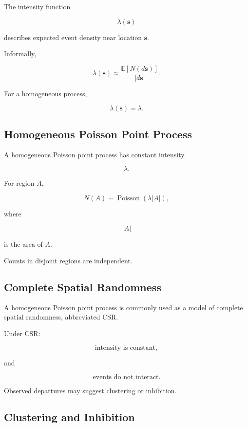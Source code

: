 The intensity function

\[
\boxed{
\lambda(\mathbf{s})
}
\]

describes expected event density near location \(\mathbf{s}\).

Informally,

\[
\boxed{
\lambda(\mathbf{s})
\approx
\frac{
\mathbb{E}
[
N(d\mathbf{s})
]
}{
|d\mathbf{s}|
}.
}
\]

For a homogeneous process,

\[
\boxed{
\lambda(\mathbf{s})
=
\lambda.
}
\]

\subsection{Homogeneous Poisson Point Process}
\label{subsec:homogeneous-poisson-point-process}

A homogeneous Poisson point process has constant intensity

\[
\lambda.
\]

For region \(A\),

\[
\boxed{
N(A)
\sim
\operatorname{Poisson}
(
\lambda|A|
),
}
\]

where

\[
|A|
\]

is the area of \(A\).

Counts in disjoint regions are independent.

\subsection{Complete Spatial Randomness}
\label{subsec:complete-spatial-randomness}

A homogeneous Poisson point process is commonly used as a model of
complete spatial randomness, abbreviated CSR.

Under CSR:

\[
\boxed{
\text{intensity is constant},
}
\]

and

\[
\boxed{
\text{events do not interact}.
}
\]

Observed departures may suggest clustering or inhibition.

\subsection{Clustering and Inhibition}
\label{subsec:clustering-inhibition}

